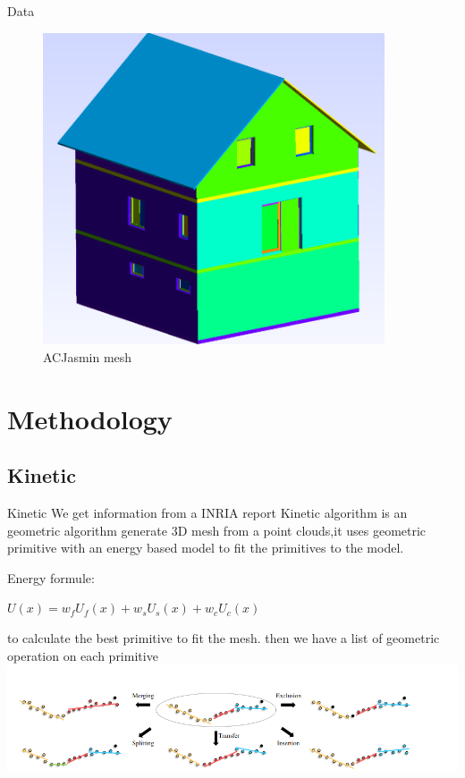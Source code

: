 \documentclass[10pt]{beamer}
\begin{document}
\begin{frame}{Data}
\begin{figure}
\begin{minipage}{0.33\textwidth}
        \end{minipage}
        \begin{minipage}{0.33\textwidth}
            \centering
            \includegraphics[width=0.9\textwidth]{../image/ACJasmin_1.png}
        \end{minipage}
        \caption{ACJasmin mesh}
    \end{figure}
\end{frame}


\section{Methodology}
\subsection{Kinetic}
\begin{frame}{Kinetic}
We get information from a INRIA report \cite{yu:hal-03767910}
Kinetic algorithm is an geometric algorithm generate 3D mesh from a point clouds,it uses  geometric primitive with an energy based model to fit the primitives to the model.

Energy formule: 
\newline
\begin{center}
    $        U(x) = w_f U_f(x) + w_s U_s(x) + w_c U_c(x)       $
\end{center}

to calculate the best primitive to fit the mesh.
then we have a list of geometric operation on each primitive
\includegraphics[scale=0.35]{../image/primitives_operation.png}
\end{frame}
\end{document}
